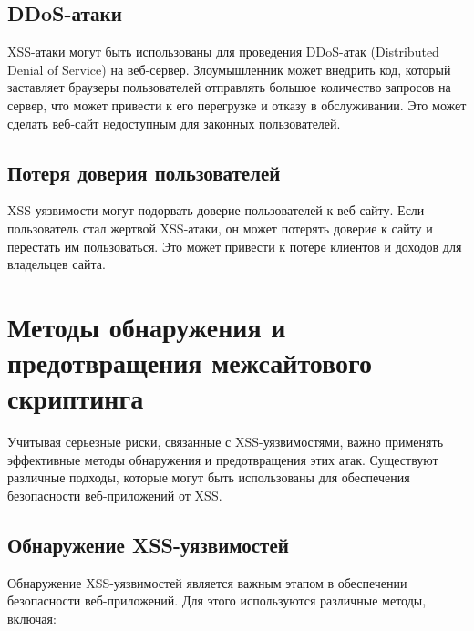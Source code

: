 \documentclass[a4paper,12pt]{diplom}
\begin{document}
	 \subsection{DDoS-атаки}
	 		
	 XSS-атаки могут быть использованы для проведения DDoS-атак (Distributed Denial of Service) на веб-сервер. Злоумышленник может внедрить код, который заставляет браузеры пользователей отправлять большое количество запросов на сервер, что может привести к его перегрузке и отказу в обслуживании. Это может сделать веб-сайт недоступным для законных пользователей.
	 		
	 \subsection{Потеря доверия пользователей} 
	 		
	 XSS-уязвимости могут подорвать доверие пользователей к веб-сайту. Если пользователь стал жертвой XSS-атаки, он может потерять доверие к сайту и перестать им пользоваться. Это может привести к потере клиентов и доходов для владельцев сайта. 
	 
	 
	 
	 
	 
	 
	 
	 
	 
	 
	 \section{Методы обнаружения и предотвращения межсайтового скриптинга}
	 
	 Учитывая серьезные риски, связанные с XSS-уязвимостями, важно применять эффективные методы обнаружения и предотвращения этих атак. Существуют различные подходы, которые могут быть использованы для обеспечения безопасности веб-приложений от XSS.
	 
	 \subsection{Обнаружение XSS-уязвимостей}
	 
	 Обнаружение XSS-уязвимостей является важным этапом в обеспечении безопасности веб-приложений. Для этого используются различные методы, включая:
	 
\end{document}
